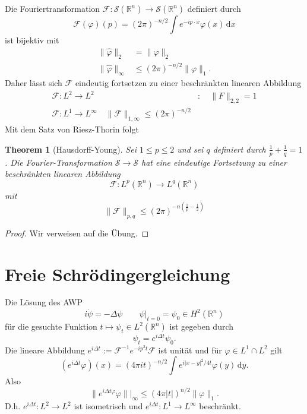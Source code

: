 \documentclass[
paper=a4,
bibtotocnumbered,
liststotocnumbered,
tablecaptionabove,
pointlessnumbers,
twoside,
openright,
10pt
]
{report}
\let\phi\varphi
\newtheorem{thm}{Theorem}[chapter]
\theoremstyle{definition}
\numberwithin{equation}{chapter}
\begin{document}
Die Fouriertransformation $\mathcal F: \mathcal S(\mathbb R^n) \to \mathcal S(\mathbb R^n)$ definiert durch
\begin{equation}
\mathcal F(\phi)(p) = (2\pi)^{-n/2} \int e^{-ip\cdot x} \phi(x) \, \mathrm dx
\end{equation}
ist bijektiv mit
\begin{align*}
\| \hat \phi \|_2 &= \| \phi\|_2\\
\| \hat \phi \|_\infty &\le (2\pi)^{-n/2} \| \phi\|_1.
\end{align*}
Daher lässt sich $\mathcal F$ eindeutig fortsetzen zu einer beschränkten linearen Abbildung
\begin{align*}
\mathcal F: L^2 \to L^2&: \quad \| F\|_{2,2}=1\\
\mathcal F: L^1\to L^\infty \quad \| \mathcal F\|_{1,\infty} \le (2\pi)^{-n/2}
\end{align*}
Mit dem Satz von Riesz-Thorin folgt
\begin{thm}[Hausdorff-Young]\label{4.4}
Sei $1\le p\le 2$ und sei $q$ definiert durch $\frac{1}{p}+\frac{1}{q}=1$. Die Fourier-Transformation $\mathcal S \to \mathcal S$ hat eine eindeutige Fortsetzung zu einer beschränkten linearen Abbildung
\begin{equation}
\mathcal F: L^p(\mathbb R^n) \to L^q(\mathbb R^n)
\end{equation}
mit
\begin{equation}
\| \mathcal F\|_{p,q} \le (2\pi)^{-n(\frac{1}{p}-\frac{1}{2})}
\end{equation}
\end{thm}
\begin{proof}
Wir verweisen auf die Übung.
\end{proof}

\section{Freie Schrödingergleichung}
Die Lösung des AWP
\begin{equation}
i\dot \psi = - \Delta \psi \qquad \psi\big|_{t=0} = \psi_0 \in H^2(\mathbb R^n)
\end{equation}
für die gesuchte Funktion $t\mapsto \psi_t \in L^2(\mathbb R^n)$ ist gegeben durch
\begin{equation}
\psi_t = e^{i\Delta t} \psi_0.
\end{equation}
Die lineare Abbildung $e^{i\Delta t} := \mathcal F^{-1} e^{-ip^2 t} \mathcal F$ ist unität und für $\phi\in L^1 \cap L^2$ gilt
\begin{equation}
\left ( e^{i\Delta t} \phi \right ) (x) =  (4\pi i t)^{-n/2} \int e^{i|x-y|^2/4t} \phi(y) \, \mathrm dy.
\end{equation}
Also
\begin{equation}
\| e^{i\Delta t\phi} \phi \||_{\infty} \le (4\pi |t|)^{n/2} \| \phi \|_1.
\end{equation}
D.h. $e^{i\Delta t}: L^2 \to L^2$ ist isometrisch und
$e^{i\Delta t}: L^1\to L^\infty$
beschränkt.
\end{document}
